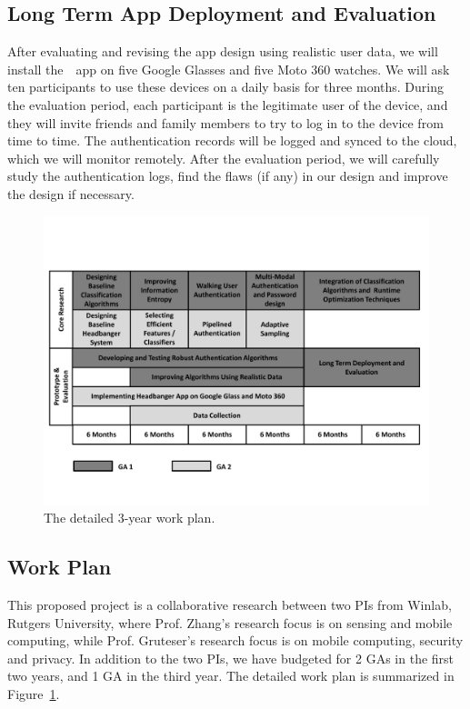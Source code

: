 \subsection{Long Term App Deployment and  Evaluation} After evaluating and revising the app design using realistic user data, we will install the~\systemname~app on five Google Glasses and five Moto 360 watches. We will ask ten participants to use these devices on a daily basis for three months. During the evaluation period, each participant is the legitimate user of the device, and they will invite friends and family members to try to log in to the device from time to time. The authentication records will be logged and synced to the cloud, which we will monitor remotely. After the evaluation period, we will carefully study the authentication logs, find the flaws (if any) in our design and improve the design if necessary. 

\begin{figure}[t]
\centering
\includegraphics[width=.5\columnwidth]{../figure/plan.pdf}

\vspace{-12pt}\caption{\label{fig:plan}The detailed 3-year work plan.} \vspace{-12pt}
\end{figure}

\subsection{Work Plan}\label{subsec:plan}\vspace{-6pt}
This proposed project is a collaborative research between two PIs from Winlab, Rutgers University, where Prof. Zhang's research focus is on sensing and mobile computing, while Prof. Gruteser's research focus is on mobile computing, security and privacy. In addition to the two PIs, we have budgeted for 2 GAs in the first two years, and 1 GA in the third year. The detailed work plan is summarized in Figure~\ref{fig:plan}.
\vspace{-6pt}